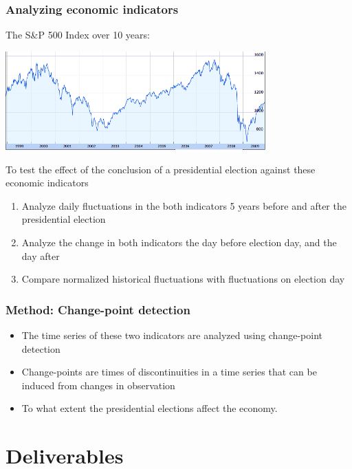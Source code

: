 \documentclass[compress,handout,10pt]{beamer}
\let\olditem\item
\renewcommand{\item}{\setlength{\itemsep}{0.5\baselineskip}\olditem}
\begin{document}
\begin{frame}
    \frametitle{Analyzing economic indicators}
The S\&P 500 Index over 10 years:
\begin{center}
            \includegraphics[width=0.75\textwidth]{images/SP500latest.png}
\end{center}

To test the effect of the conclusion of a presidential election against these economic indicators

\begin{enumerate}
\item Analyze daily fluctuations in the both indicators 5 years before and after the presidential election
\item Analyze the change in both indicators the day before election day, and the day after
\item Compare normalized historical fluctuations with fluctuations on election day
\end{enumerate}

\end{frame}

\begin{frame}
    \frametitle{Method: Change-point detection}


\begin{itemize}
\item The time series of these two indicators are analyzed using change-point detection

\item Change-points are times of discontinuities in a time series that can be induced from changes in observation

\item To what extent the presidential elections affect the economy.

\end{itemize}

\end{frame}

\section{Deliverables}
\end{document}
